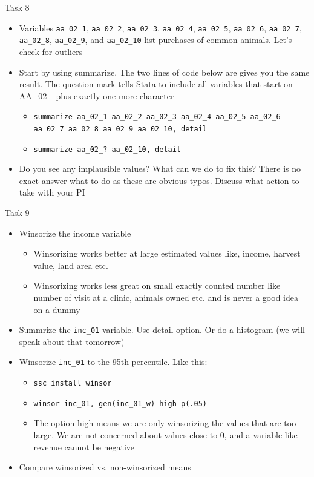 \documentclass[aspectratio=169]{beamer}
\begin{document}
\begin{frame}{Task 8}
	\begin{itemize}
		\item Variables \texttt{aa\_02\_1}, \texttt{aa\_02\_2}, \texttt{aa\_02\_3}, \texttt{aa\_02\_4}, \texttt{aa\_02\_5}, \texttt{aa\_02\_6}, \texttt{aa\_02\_7}, \texttt{aa\_02\_8}, \texttt{aa\_02\_9}, and \texttt{aa\_02\_10} list purchases of common animals. Let’s check for outliers
		\item Start by using summarize. The two lines of code below are gives you the same result. The question mark tells Stata to include all variables that start on AA\_02\_ plus exactly one more character
		\begin{itemize}
			\item \texttt{summarize aa\_02\_1 aa\_02\_2 aa\_02\_3 aa\_02\_4 aa\_02\_5 aa\_02\_6 aa\_02\_7 aa\_02\_8 aa\_02\_9 aa\_02\_10, detail}
			\item \texttt{summarize aa\_02\_? aa\_02\_10, detail}
		\end{itemize}
		\item Do you see any implausible values? What can we do to fix this? There is no exact answer what to do as these are obvious typos. Discuss what action to take with your PI
	\end{itemize}
\end{frame}

\begin{frame}{Task 9}
	\begin{itemize}
		\item Winsorize the income variable
		\begin{itemize}
			\item Winsorizing works better at large estimated values like, income, harvest value, land area etc.
			\item Winsorizing works less great on small exactly counted number like number of visit at a clinic, animals owned etc. and is never a good idea on a dummy
		\end{itemize}
		\item Summrize the \texttt{inc\_01} variable. Use detail option. Or do a histogram (we will speak about that tomorrow)
		\item Winsorize \texttt{inc\_01} to the 95th percentile. Like this:
			\begin{itemize}
				\item \texttt{ssc install winsor}
				\item \texttt{winsor inc\_01, gen(inc\_01\_w) high p(.05)}
				\item The option high means we are only winsorizing the values that are too large. We are not concerned about values close to 0, and a variable like revenue cannot be negative
			\end{itemize}
		\item Compare winsorized vs. non-winsorized means
	\end{itemize}
\end{frame}
\end{document}
